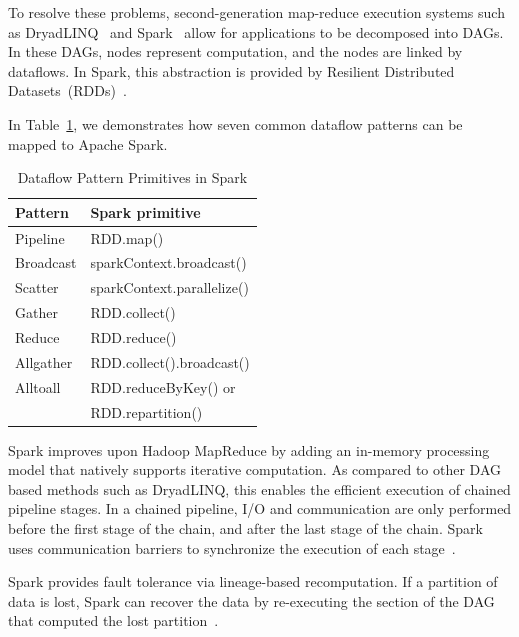 \documentclass[conference]{IEEEtran}
\newcommand{\up}{\vspace*{-1em}}
\begin{document}
To resolve these problems, second-generation map-reduce execution systems such as
DryadLINQ~\cite{yu08} and Spark~\cite{zaharia12} allow for applications to be decomposed into
DAGs. In these DAGs, nodes represent computation, and the nodes are
linked by dataflows. In Spark, this abstraction is provided by Resilient Distributed Datasets~(RDDs)~\cite{zaharia12}.

In Table~\ref{tb:Patterns}, we demonstrates how seven common dataflow patterns can be mapped
to Apache Spark.

\begin{table}[h]
  \begin{center}
  \caption{Dataflow Pattern Primitives in Spark}
    \begin{small}
    \begin{tabular}{ | p{1.8cm} | p{5.5cm} |}
    \hline
    Pattern & Spark primitive \\
    \hline \hline
    Pipeline & RDD.map()  \\ 
    Broadcast & sparkContext.broadcast() \\   
    Scatter & sparkContext.parallelize() \\ 
    Gather & RDD.collect() \\ 
    Reduce & RDD.reduce() \\ 
    Allgather & RDD.collect().broadcast() \\ 
    Alltoall & RDD.reduceByKey() or \\
 & RDD.repartition() \\ 
    \hline
    \end{tabular}
    \end{small}   
  \label{tb:Patterns}     	
  \end{center}
\end{table}

\up
Spark improves upon
Hadoop MapReduce by adding an in-memory processing model that natively supports iterative computation. 
As compared to other DAG based methods such as DryadLINQ, this enables
the efficient execution of chained pipeline stages. In a chained pipeline,
I/O and communication are only performed before the first stage of the chain, and after the
last stage of the chain. Spark uses communication barriers to synchronize the execution of each stage~\cite{zaharia12}.

Spark provides fault tolerance via
lineage-based recomputation. If a partition of data is lost, Spark can recover the data
by re-executing the section of the DAG that computed the lost partition~\cite{zaharia12}. 
\end{document}

